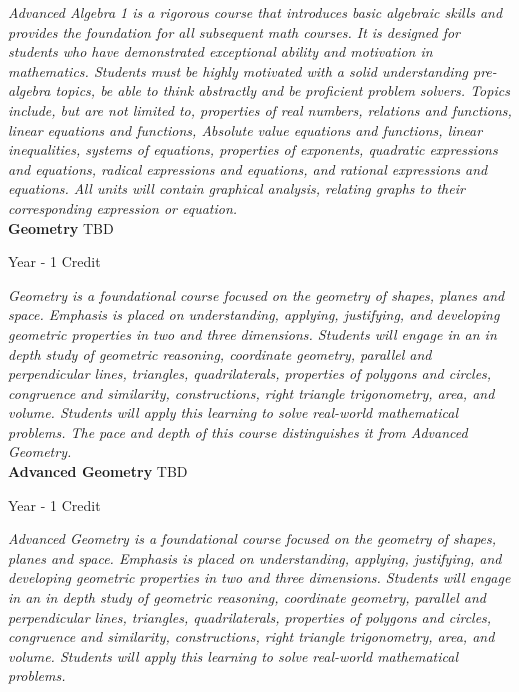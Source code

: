 \vspace{1mm}\emph{Advanced Algebra 1 is a rigorous course that introduces basic algebraic skills and provides the foundation for all subsequent math courses. It is designed for students who have demonstrated exceptional ability and motivation in mathematics. Students must be highly motivated with a solid understanding pre-algebra topics, be able to think abstractly and be proficient problem solvers. Topics include, but are not limited to, properties of real numbers, relations and functions, linear equations and functions, Absolute value equations and functions, linear inequalities, systems of equations, properties of exponents, quadratic expressions and equations, radical expressions and equations, and rational expressions and equations. All units will contain graphical analysis, relating graphs to their corresponding expression or equation.}\\

\noindent\textbf{Geometry} \hfill TBD

\noindent Year - 1 Credit

\vspace{1mm}\emph{Geometry is a foundational course focused on the geometry of shapes, planes and space. Emphasis is placed on understanding, applying, justifying, and developing geometric properties in two and three dimensions. Students will engage in an in depth study of geometric reasoning, coordinate geometry, parallel and perpendicular lines, triangles, quadrilaterals, properties of polygons and circles, congruence and similarity, constructions, right triangle trigonometry, area, and volume. Students will apply this learning to solve real-world mathematical problems. The pace and depth of this course distinguishes it from Advanced Geometry.}\\

\noindent\textbf{Advanced Geometry} \hfill TBD

\noindent Year - 1 Credit

\vspace{1mm}\emph{Advanced Geometry is a foundational course focused on the geometry of shapes, planes and space. Emphasis is placed on understanding, applying, justifying, and developing geometric properties in two and three dimensions. Students will engage in an in depth study of geometric reasoning, coordinate geometry, parallel and perpendicular lines, triangles, quadrilaterals, properties of polygons and circles, congruence and similarity, constructions, right triangle trigonometry, area, and volume. Students will apply this learning to solve real-world mathematical problems.}\\

